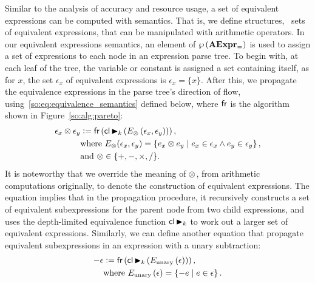 Similar to the analysis of accuracy and resource usage, a set of equivalent
expressions can be computed with semantics. That is, we define structures,
\ie~sets of equivalent expressions, that can be manipulated with arithmetic
operators. In our equivalent expressions semantics, an element of
$\wp\left({\mathbf{AExpr}_\equiv}\right)$ is used to assign a set of expressions to each node in
an expression parse tree. To begin with, at each leaf of the tree, the
variable or constant is assigned a set containing itself, as for $x$, the set
$\epsilon_x$ of equivalent expressions is $\epsilon_x = \{x\}$. After this, we
propagate the equivalence expressions in the parse tree's direction of flow,
using~\eqref{so:eq:equivalence_semantics} defined below, where $\operatorname{\mathsf{fr}}$ is
the algorithm shown in Figure~\ref{so:alg:pareto}:
\begin{equation}
    \begin{aligned}
        \epsilon_x \otimes \epsilon_y &\vcentcolon= \operatorname{\mathsf{fr}}\left(
            \operatorname{\mathsf{cl}} \operatorname{\blacktriangleright}_k \left(
                E_\otimes \left( \epsilon_x, \epsilon_y \right)
            \right) \right), \\
        & \text{where~}
        E_\otimes(\epsilon_x, \epsilon_y) = \left\{
            e_x \otimes e_y \mid e_x \in \epsilon_x \wedge e_y \in \epsilon_y
        \right\}, \\
        & \text{and~} \otimes\in\{ +, -, \times, / \}.
    \end{aligned}
    \label{so:eq:equivalence_semantics}
\end{equation}
It is noteworthy that we override the meaning of $\otimes$, from arithmetic
computations originally, to denote the construction of equivalent expressions.
The equation implies that in the propagation procedure, it recursively
constructs a set of equivalent subexpressions for the parent node from two
child expressions, and uses the depth-limited equivalence function $\operatorname{\mathsf{cl}}
\operatorname{\blacktriangleright}_k$ to work out a larger set of equivalent expressions.  Similarly, we
can define another equation that propagate equivalent subexpressions in an
expression with a unary subtraction:
\begin{equation}
    \begin{aligned}
        -\epsilon &\vcentcolon= \operatorname{\mathsf{fr}}\left(
            \operatorname{\mathsf{cl}} \operatorname{\blacktriangleright}_k \left(
                E_{\mathrm{unary}} \left( \epsilon \right)
            \right) \right), \\
        & \text{where~}
        E_\mathrm{unary} \left( \epsilon \right) = \left\{
            -e \mid e \in \epsilon
        \right\}.
    \end{aligned}
    \label{so:eq:equivalence_semantics_unary}
\end{equation}

